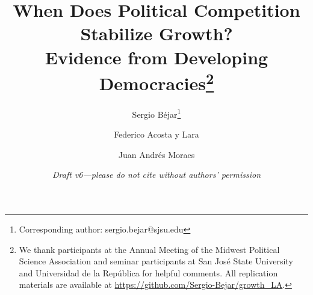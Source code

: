 \documentclass[12pt]{article}
\begin{document}
\title{\large\bfseries When Does Political Competition Stabilize Growth?\\
Evidence from Developing Democracies\thanks{We thank participants at the Annual Meeting of the
Midwest Political Science Association and seminar participants at San Jos\'{e}
State University and Universidad de la Rep\'{u}blica for helpful comments.
All replication materials are available at
\url{https://github.com/Sergio-Bejar/growth\_LA}.}}

\author[1]{Sergio B\'{e}jar\thanks{Corresponding author: sergio.bejar@sjsu.edu}}
\author[2]{Federico Acosta y Lara}
\author[3]{Juan Andr\'{e}s Moraes}


\date{\textit{Draft v6---please do not cite without authors' permission}}

\maketitle
\thispagestyle{empty}
\end{document}
